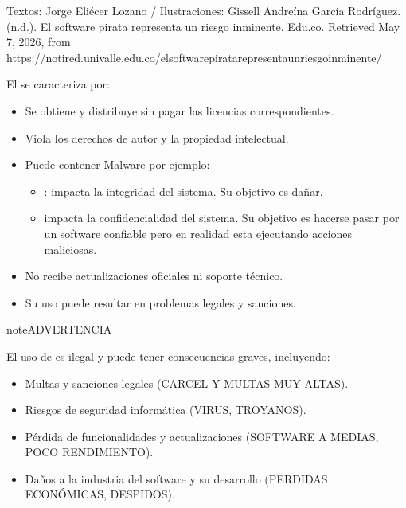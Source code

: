 \documentclass[letterpaper,10pt,spanish]{sphinxmanual}
\begin{document}
\sphinxAtStartPar
%
\begin{footnote}[15]\sphinxAtStartFootnote
Textos: Jorge Eliécer Lozano / Ilustraciones: Gissell Andreína García Rodríguez. (n.d.). El software pirata representa un riesgo inminente. Edu.co. Retrieved May 7, 2026, from https://notired.univalle.edu.co/el\sphinxhyphen{}software\sphinxhyphen{}pirata\sphinxhyphen{}representa\sphinxhyphen{}un\sphinxhyphen{}riesgo\sphinxhyphen{}inminente/
%
\end{footnote} El  se caracteriza por:
\begin{itemize}
\item {} 
\sphinxAtStartPar
Se obtiene y distribuye sin pagar las licencias correspondientes.

\item {} 
\sphinxAtStartPar
Viola los derechos de autor y la propiedad intelectual.

\item {} 
\sphinxAtStartPar
Puede contener Malware por ejemplo:
\begin{itemize}
\item {} 
\sphinxAtStartPar
{}: impacta la integridad del sistema. Su objetivo es dañar.

\item {} 
\sphinxAtStartPar
{} impacta la confidencialidad del sistema. Su objetivo es hacerse pasar por un software confiable pero en realidad esta ejecutando acciones maliciosas.

\end{itemize}

\item {} 
\sphinxAtStartPar
No recibe actualizaciones oficiales ni soporte técnico.

\item {} 
\sphinxAtStartPar
Su uso puede resultar en problemas legales y sanciones.

\end{itemize}

\begin{sphinxadmonition}{note}{ADVERTENCIA}

\sphinxAtStartPar
El uso de  es ilegal y puede tener consecuencias graves, incluyendo:
\begin{itemize}
\item {} 
\sphinxAtStartPar
Multas y sanciones legales (CARCEL Y MULTAS MUY ALTAS).

\item {} 
\sphinxAtStartPar
Riesgos de seguridad informática (VIRUS, TROYANOS).

\item {} 
\sphinxAtStartPar
Pérdida de funcionalidades y actualizaciones (SOFTWARE A MEDIAS, POCO RENDIMIENTO).

\item {} 
\sphinxAtStartPar
Daños a la industria del software y su desarrollo (PERDIDAS ECONÓMICAS, DESPIDOS).

\end{itemize}
\end{sphinxadmonition}
\end{document}
